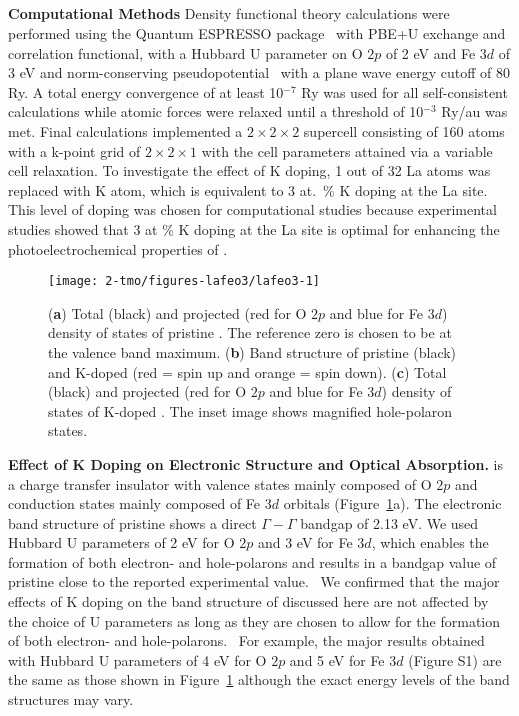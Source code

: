 \subsection{}

\textbf{Computational Methods} Density functional theory calculations were performed using the Quantum ESPRESSO package~\cite{QE1} with PBE+U exchange and correlation functional, with a Hubbard U parameter on O $2p$ of 2 eV and Fe $3d$ of 3 eV and norm-conserving pseudopotential~\cite{ONCV1} with a plane wave energy cutoff of 80 Ry. A total energy convergence of at least 10$^{-7}$ Ry was used for all self-consistent calculations while atomic forces were relaxed until a threshold of 10$^{-3}$ Ry/au was met. Final calculations implemented a $2\times 2\times 2$ supercell consisting of 160 atoms with a k-point grid of $2\times 2\times 1$ with the cell parameters attained via a variable cell relaxation. To investigate the effect of K doping, 1 out of 32 La atoms was replaced with K atom, which is equivalent to 3 at.\ \% K doping at the La site. This level of doping was chosen for computational studies because experimental studies showed that 3 at \% K doping at the La site is optimal for enhancing the photoelectrochemical properties of .


\begin{figure}
    \centering
    \texttt{[image: 2-tmo/figures-lafeo3/lafeo3-1]}
    \caption{
        (\textbf{a}) Total (black) and projected (red for O $2p$ and blue for Fe $3d$) density of states of pristine . The reference zero is chosen to be at the valence band maximum. (\textbf{b}) Band structure of pristine (black) and K-doped  (red = spin up and orange = spin down). (\textbf{c}) Total (black) and projected (red for O $2p$ and blue for Fe $3d$) density of states of K-doped . The inset image shows magnified hole-polaron states.
    }
    \label{lafeo3:fig:prist}
\end{figure}


\textbf{Effect of K Doping on Electronic Structure and Optical Absorption.}	 is a charge transfer insulator with valence states mainly composed of O $2p$ and conduction states mainly composed of Fe $3d$ orbitals (Figure~\ref{lafeo3:fig:prist}a). The electronic band structure of pristine  shows a direct $\Gamma-\Gamma$ bandgap of 2.13 eV. We used Hubbard U parameters of 2 eV for O $2p$ and 3 eV for Fe $3d$, which enables the formation of both electron- and hole-polarons and results in a bandgap value of pristine  close to the reported experimental value.~\cite{wheeler2017photoelectrochemical} We confirmed that the major effects of K doping on the band structure of  discussed here are not affected by the choice of U parameters as long as they are chosen to allow for the formation of both electron- and hole-polarons.~\cite{smart2018mechanistic,seo2018role,smart2017effect,wu2018combining} For example, the major results obtained with Hubbard U parameters of 4 eV for O $2p$ and 5 eV for Fe $3d$ (Figure S1) are the same as those shown in Figure~\ref{lafeo3:fig:prist} although the exact energy levels of the band structures may vary.

